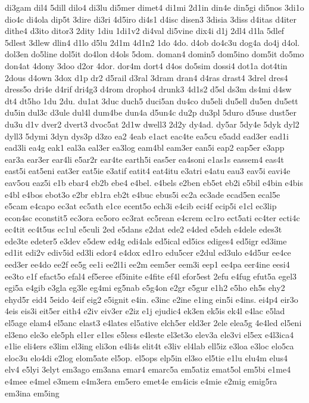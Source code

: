 {di3gam
dil4
5dill
dilo4
di3lu
di5mer
dimet4
di1mi
2d1in
din4e
din5gi
di5nos
3di1o
dio4c
di4ola
dip5t
3dire
di3ri
4d5iro
di4s1
d4isc
disen3
3disia
3diss
d4itas
d4iter
dithe4
d3ito
ditor3
2dity
1diu
1di1v2
di4val
di5vine
dix4i
d1j
2dl4
d1la
5dlef
5dlest
3dlew
dlin4
d1lo
d5lu
2d1m
4d1n2
1do
4do.
d4ob
do4c3u
dog4a
do4j
d4ol.
dol3en
do5line
dol5it
do4lon
d4ols
5dom.
doman4
domin5
dom5ino
dom5it
do5mo
don4at
4dony
3doo
d2or
4dor.
dor4m
dort4
d4os
do5sim
dossi4
dot1a
dot4tin
2dous
d4own
3dox
d1p
dr2
d5rail
d3ral
3dram
dran4
d4ras
drast4
3drel
dres4
dress5o
dri4e
d4rif
dri4g3
d4rom
dropho4
drunk3
4d1s2
d5sl
ds3m
ds4mi
d4sw
dt4
dt5ho
1du
2du.
du1at
3duc
duch5
duci5an
du4co
du5eli
du5ell
du5en
du5ett
du5in
dul3c
d3ule
dul4l
dum4be
dun4a
d5un4c
du2p
du3pl
5duro
d5use
dust5er
du3u
d1v
dver2
dvert3
dvoc5at
2d1w
dwell3
2d2y
dy4ad.
dy5ar
5dy4e
5dyk
dyl2
dyll3
5dymi
3dyn
dys3p
d3zo
ea2
4eab
e1act
eac4te
ea5cu
e5add
ead3er
ead1i
ead3li
ea4g
eak1
eal3a
eal3er
ea3log
eam4bl
eam3er
ean5i
eap2
eap5er
e3app
ear3a
ear3er
ear4li
e5ar2r
ear4te
earth5i
eas5er
ea4soni
e1as1s
eassem4
eas4t
east5i
eat5eni
eat3er
eat5ie
e3atif
eatit4
eat4itu
e3atri
e4atu
eau3
eav5i
eavi4e
eav5ou
eaz5i
e1b
ebar4
eb2b
ebe4
e4bel.
e4bels
e2ben
eb5et
eb2i
e5bil
e4bin
e4bis
e4bl
e4bos
ebot3o
e2br
eb1ra
eb2t
e4buc
ebus5i
ec2a
ec3ade
ecad5en
ecal5e
e5cam
e4capo
ec3at
ec5ath
e1ce
ecent5o
ech3i
e4cib
eci4f
ecip5i
e1cl
ec3lip
econ4sc
econstit5
ec3ora
ec5oro
ec3rat
ec5rean
e4crem
ec1ro
ect5ati
ec4ter
ecti4c
ec4tit
ec4t5us
ec1ul
e5culi
2ed
e5dans
e2dat
ede2
e4ded
e5deh
e4dele
edes3t
ede3te
edeter5
e3dev
e5dew
ed4g
edi4als
ed5ical
ed5ics
ediges4
ed5igr
ed3ime
ed1it
edi2v
ediv5id
ed3li
edor4
e4dox
ed1ro
edu5cer
e2dul
ed3ulo
e4d5ur
ee4ce
eed3er
ee4do
ee2f
ee5g
ee1i
ee2l1i
ee2m
eem5er
eem3i
eep1
ee4pa
eer4ine
eesi4
ee3to
e1f
efact5o
efal4
ef5eree
ef5inite
e4fite
ef4l
efor5est
2efu
e4fug
efut5a
egel3
egi5a
e4gib
e3gla
eg3le
eg4mi
eg5nab
e5g4on
e2gr
e5gur
e1h2
e5ho
eh5s
ehy2
ehyd5r
eid4
5eido
4eif
eig2
e5ignit
e4in.
e3inc
e2ine
e1ing
ein5i
e4ins.
ei4p4
eir3o
4eis
eis3i
eit5er
eith4
e2iv
eiv3er
e2iz
e1j
ejudic4
ek3en
ek5is
ek4l
e4lac
e5lad
el5age
elam4
el5anc
elast3
e4lates
el5ative
elch5er
eld3er
2ele
elea5g
4e4led
el5eni
el3eno
ele3o
ele5ph
el1er
e1les
e5less
e4leste
el3et3o
elev3a
ele3vi
el5ex
e4l3ica4
e1lie
eli4ers
e3lim
el3ing
eli3on
e4li4s
elit4t
e3liv
el4lab
ell5iz
e3loa
e3loc
elo5ca
eloc3u
elo4di
e2log
elom5ate
el5op.
el5ops
elp5in
el3so
el5tie
e1lu
elu4m
elus4
elv4
e5lyi
3elyt
em3ago
em3ana
emar4
emarc5a
em5atiz
emat5ol
em5bi
e1me4
e4mee
e4mel
e3mem
e4m3era
em5ero
emet4e
em4icis
e4mie
e2mig
emig5ra
em3ina
em5ing
}
